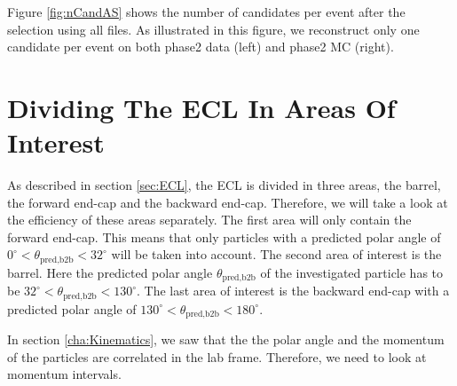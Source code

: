 \documentclass[a4paper,11pt,twosided,final,german,openbib,pdftex,listof=totoc,bibliography=totoc]{scrbook}
\begin{document}
Figure \ref{fig:nCandAS} shows the number of candidates per event after the selection using all files. As illustrated in this figure, we reconstruct only one candidate per event on both phase2 data (left) and phase2 MC (right).


\section{Dividing The ECL In Areas Of Interest}
\label{sec:DivECL}

As described in section \ref{sec:ECL}, the ECL is divided in three areas, the barrel, the forward end-cap and the backward end-cap. Therefore, we will take a look at the efficiency of these areas separately. The first area will only contain the forward end-cap. This means that only particles with a predicted polar angle of $0^\circ <\theta_{\textrm{pred,b2b}}<32^\circ$ will be taken into account. 
The second area of interest is the barrel. Here the predicted polar angle $\theta_{\textrm{pred,b2b}}$ of the investigated particle has to be $32^\circ < \theta_{\textrm{pred,b2b}} < 130^\circ$. The last area of interest is the backward end-cap with a predicted polar angle of $130^\circ <\theta_{\textrm{pred,b2b}} < 180^\circ$.
\newline  

In section \ref{cha:Kinematics}, we saw that the the polar angle and the momentum of the particles are correlated in the lab frame. Therefore, we need to look at momentum intervals. 
\end{document}
